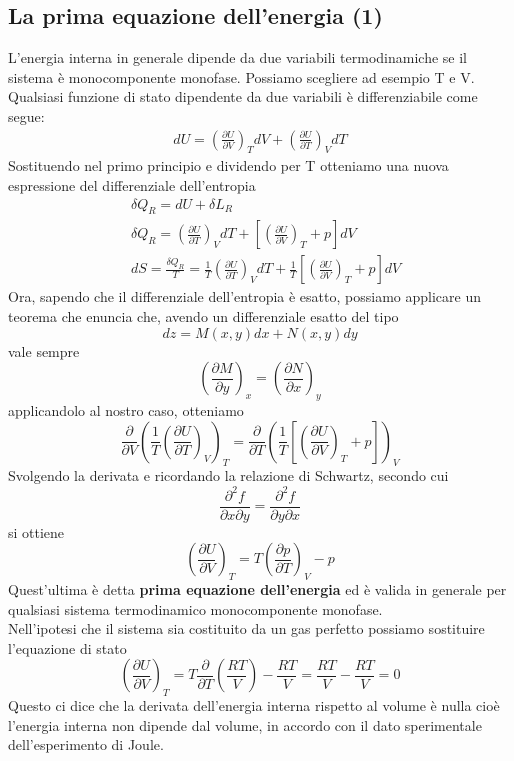 \documentclass[
10pt, %
a4paper, %
oneside, %
headinclude,footinclude, %
BCOR5mm, %
]{scrartcl}
\begin{document}
\subsection{La prima equazione dell'energia (1)}\label{sec:prima_eq_energia1}
L'energia interna in generale dipende da due variabili termodinamiche se il sistema è monocomponente monofase. Possiamo scegliere ad esempio T e V. Qualsiasi funzione di stato dipendente da due variabili è differenziabile come segue:
\begin{align*}
	dU = \left(\frac{\partial U}{\partial V}\right)_TdV+\left(\frac{\partial U}{\partial T}\right)_VdT
\end{align*}
Sostituendo nel primo principio e dividendo per T otteniamo una nuova espressione del differenziale dell'entropia
\begin{align*}
	&\delta Q_R = dU + \delta L_R\\
	&\delta Q_R = \left(\frac{\partial U}{\partial T}\right)_VdT + \left[\left(\frac{\partial U}{\partial V}\right)_T+p\right]dV\\
	&dS = \frac{\delta Q_R}{T} = \frac{1}{T}\left(\frac{\partial U}{\partial T}\right)_VdT + \frac{1}{T}\left[\left(\frac{\partial U}{\partial V}\right)_T+p\right]dV
\end{align*}
Ora, sapendo che il differenziale dell'entropia è esatto, possiamo applicare un teorema che enuncia che, avendo un differenziale esatto del tipo
\[dz = M(x,y)dx + N(x,y)dy\]
vale sempre
\[\left(\frac{\partial M}{\partial y}\right)_x=\left(\frac{\partial N}{\partial x}\right)_y\] 
applicandolo al nostro caso, otteniamo 
\[\frac{\partial }{\partial V} \left(\frac{1}{T}\left(\frac{\partial U}{\partial T}\right)_V\right)_T=\frac{\partial }{\partial T}\left( \frac{1}{T}\left[\left(\frac{\partial U}{\partial V}\right)_T+p\right]\right)_V\]
Svolgendo la derivata e ricordando la relazione di Schwartz, secondo cui
\[\frac{\partial^2 f}{\partial x \partial y} = \frac{\partial^2 f}{\partial y \partial x} \]
si ottiene 
\[\left(\frac{\partial U}{\partial V}\right)_T= T\left(\frac{\partial p}{\partial T}\right)_V-p\]
Quest'ultima è detta \textbf{prima equazione dell'energia} ed è valida in generale per qualsiasi sistema termodinamico monocomponente monofase.\\
Nell'ipotesi che il sistema sia costituito da un gas perfetto possiamo sostituire l'equazione di stato 
\[\left(\frac{\partial U}{\partial V}\right)_T= T\frac{\partial }{\partial T}\left(\frac{RT}{V}\right)-\frac{RT}{V}=\frac{RT}{V}-\frac{RT}{V}=0\]
Questo ci dice che la derivata dell'energia interna rispetto al volume è nulla cioè l'energia interna non dipende dal volume, in accordo con il dato sperimentale dell'esperimento di Joule. 
\end{document}
